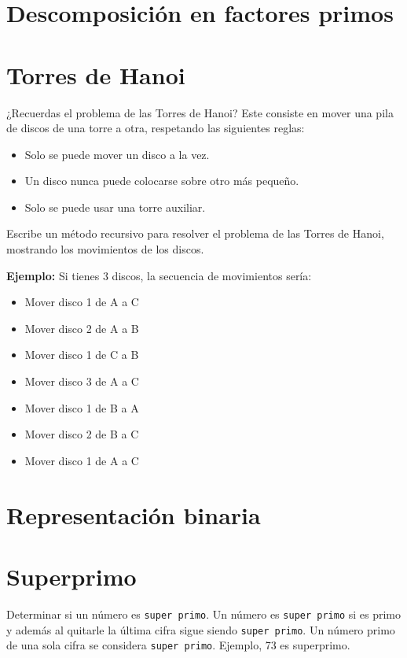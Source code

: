 \section{Descomposición en factores primos}


\section{Torres de Hanoi}
¿Recuerdas el problema de las Torres de Hanoi? Este consiste en mover una pila de discos de una torre a otra, respetando las siguientes reglas:
\begin{itemize}
    \item Solo se puede mover un disco a la vez.
    \item Un disco nunca puede colocarse sobre otro más pequeño.
    \item Solo se puede usar una torre auxiliar.
\end{itemize}

Escribe un método recursivo para resolver el problema de las Torres de Hanoi, mostrando los movimientos de los discos.

\textbf{Ejemplo:}
Si tienes 3 discos, la secuencia de movimientos sería:
\begin{itemize}
    \item Mover disco 1 de A a C
    \item Mover disco 2 de A a B
    \item Mover disco 1 de C a B
    \item Mover disco 3 de A a C
    \item Mover disco 1 de B a A
    \item Mover disco 2 de B a C
    \item Mover disco 1 de A a C
\end{itemize}

\section{Representación binaria}


\section{Superprimo}
Determinar si un número es \texttt{super primo}. Un número es \texttt{super primo} si es primo y además al quitarle la última cifra sigue siendo \texttt{super primo}. Un número primo de una sola cifra se considera \texttt{super primo}. Ejemplo, 73 es superprimo.

